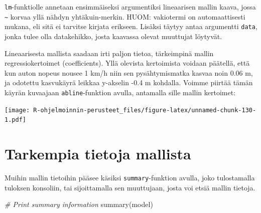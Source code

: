 \documentclass[
]{book}
\newenvironment{Shaded}{\begin{snugshade}}{\end{snugshade}}
\newcommand{\AttributeTok}[1]{\textcolor[rgb]{0.77,0.63,0.00}{#1}}
\newcommand{\CommentTok}[1]{\textcolor[rgb]{0.56,0.35,0.01}{\textit{#1}}}
\newcommand{\DecValTok}[1]{\textcolor[rgb]{0.00,0.00,0.81}{#1}}
\newcommand{\FunctionTok}[1]{\textcolor[rgb]{0.00,0.00,0.00}{#1}}
\newcommand{\NormalTok}[1]{#1}
\newcommand{\SpecialCharTok}[1]{\textcolor[rgb]{0.00,0.00,0.00}{#1}}
\newcommand{\StringTok}[1]{\textcolor[rgb]{0.31,0.60,0.02}{#1}}
\begin{document}
\texttt{lm}-funktiolle annetaan ensimmäiseksi argumentiksi lineaarisen mallin kaava, jossa \texttt{\textasciitilde{}} korvaa yllä nähdyn yhtäkuin-merkin. HUOM: vakiotermi on automaattisesti mukana, eli sitä ei tarvitse kirjata erikseen. Lisäksi täytyy antaa argumentti \texttt{data}, jonka tulee olla datakehikko, josta kaavassa olevat muuttujat löytyvät.

Lineaarisesta mallista saadaan irti paljon tietoa, tärkeimpinä mallin regressiokertoimet (coefficients). Yllä olevista kertoimista voidaan päätellä, että kun auton nopeus nousee 1 km/h niin sen pysähtymismatka kasvaa noin 0.06 m, ja odotettu kasvukäyrä leikkaa y-akselin -0.4 m kohdalla. Voimme piirtää tämän käyrän kuvaajaan \texttt{abline}-funktion avulla, antamalla sille mallin kertoimet:

\begin{Shaded}
\end{Shaded}

\texttt{[image: R-ohjelmoinnin-perusteet\_files/figure-latex/unnamed-chunk-130-1.pdf]}

\hypertarget{tarkempia-tietoja-mallista}{%
\section{Tarkempia tietoja mallista}\label{tarkempia-tietoja-mallista}}

Muihin mallin tietoihin pääsee käsiksi \texttt{summary}-funktion avulla, joko tulostamalla tuloksen konsoliin, tai sijoittamalla sen muuttujaan, josta voi etsiä mallin tietoja.

\begin{Shaded}
\begin{Highlighting}[]
\CommentTok{\# Print summary information}
\FunctionTok{summary}\NormalTok{(model)}
\end{Highlighting}
\end{Shaded}
\end{document}
